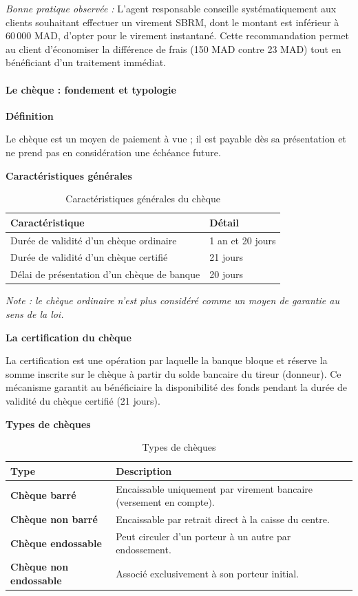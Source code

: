 \textit{Bonne pratique observée :} L'agent responsable conseille systématiquement aux clients souhaitant effectuer un virement SBRM, dont le montant est inférieur à 60\,000 MAD, d'opter pour le virement instantané. Cette recommandation permet au client d'économiser la différence de frais (150 MAD contre 23 MAD) tout en bénéficiant d'un traitement immédiat.

\paragraph{Le chèque : fondement et typologie}

\medskip\textbf{Définition}

Le chèque est un moyen de paiement à vue ; il est payable dès sa présentation et ne prend pas en considération une échéance future.

\medskip\textbf{Caractéristiques générales}

\begin{table}[h!]
\centering
\begin{tabularx}{\textwidth}{X X}
\toprule
Caractéristique & Détail \\
\midrule
Durée de validité d'un chèque ordinaire & 1 an et 20 jours \\
Durée de validité d'un chèque certifié & 21 jours \\
Délai de présentation d'un chèque de banque & 20 jours \\
\bottomrule
\end{tabularx}
\caption{Caractéristiques générales du chèque}
\end{table}

\textit{Note : le chèque ordinaire n'est plus considéré comme un moyen de garantie au sens de la loi.}

\medskip\textbf{La certification du chèque}

La certification est une opération par laquelle la banque bloque et réserve la somme inscrite sur le chèque à partir du solde bancaire du tireur (donneur). Ce mécanisme garantit au bénéficiaire la disponibilité des fonds pendant la durée de validité du chèque certifié (21 jours).

\medskip\textbf{Types de chèques}

\begin{table}[h!]
\centering
\begin{tabularx}{\textwidth}{>{\bfseries}l X}
\toprule
Type & Description \\
\midrule
Chèque barré & Encaissable uniquement par virement bancaire (versement en compte). \\
Chèque non barré & Encaissable par retrait direct à la caisse du centre. \\
Chèque endossable & Peut circuler d'un porteur à un autre par endossement. \\
Chèque non endossable & Associé exclusivement à son porteur initial. \\
\bottomrule
\end{tabularx}
\caption{Types de chèques}
\end{table}

